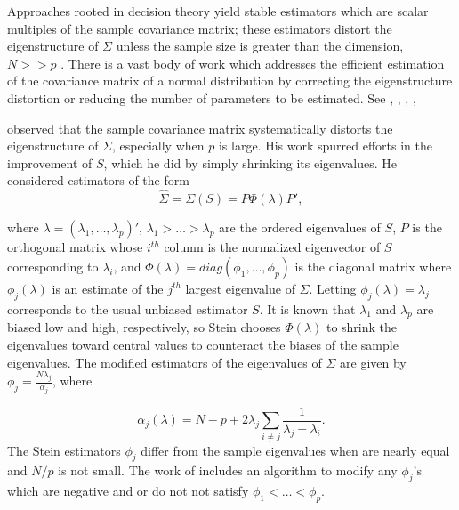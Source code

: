 \bigskip

Approaches rooted in decision theory yield stable estimators which are scalar multiples of the sample covariance matrix; these estimators distort the eigenstructure of $\Sigma$ unless the sample size is greater than the dimension, $N >> p$ \citep{dempster1972covariance}.  There is a vast body of work which addresses the efficient estimation of the covariance matrix of a normal distribution by correcting the eigenstructure distortion or reducing the number of parameters to be estimated. See \cite{stein1975estimation}, \cite{lin1985monte}, \cite{yang1994estimation}, \cite{daniels1999nonconjugate}, \cite{champion2003empirical} 


\cite{stein1975estimation} observed that the sample covariance matrix systematically distorts the eigenstructure of $\Sigma$, especially when $p$ is large. His work spurred efforts in the improvement of $S$, which he did by simply shrinking its eigenvalues.  He considered estimators of the form
\begin{equation}\label{eq:stein-eigen-estimator}
\hat{\Sigma} = \Sigma\left(S\right) = P \Phi\left(\lambda\right) P',
\end{equation}

\noindent
where $\lambda = \left(\lambda_1, \dots, \lambda_p\right)'$, $\lambda_1 > \dots > \lambda_p$ are the ordered eigenvalues of $S$, $P$ is the orthogonal matrix whose $i^{th}$ column is the normalized eigenvector of $S$ corresponding to $\lambda_i$, and $\Phi\left(\lambda\right) = diag\left(\phi_1,\dots, \phi_p \right)$ is the diagonal matrix where $\phi_j\left(\lambda \right)$ is an estimate of the $j^{th}$ largest eigenvalue of $\Sigma$. Letting $\phi_j\left(\lambda \right) = \lambda_j$ corresponds to the usual unbiased estimator $S$. It is known that $\lambda_1$ and $\lambda_p$ are biased low and high, respectively, so Stein chooses $\Phi\left(\lambda\right)$ to shrink the eigenvalues toward central values to counteract the biases of the sample eigenvalues. The modified estimators of the eigenvalues of $\Sigma$ are given by $\phi_j = \frac{N \lambda_j}{\alpha_j}$, where

\begin{equation}\label{eq:stein-eigen-estimator}
\alpha_j\left(\lambda\right) = N - p + 2\lambda_j \sum_{i \ne j} \frac{1}{\lambda_j - \lambda_i}.
\end{equation}
\noindent
The Stein estimators $\phi_j$ differ from the sample eigenvalues when are nearly equal and $N/p$ is not small. The work of \cite{lin1985monte} includes an algorithm to modify any $\phi_j$'s which are negative and or do not not satisfy $\phi_1 < \dots < \phi_p$.

